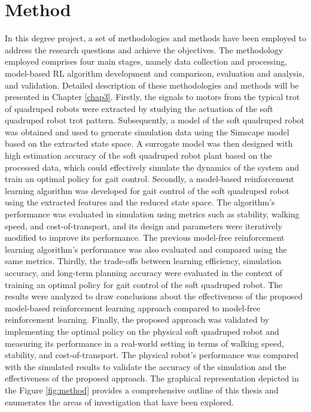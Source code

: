 \section{Method}
In this degree project, a set of methodologies and methods have been employed to address the research questions and achieve the objectives. The methodology employed comprises four main stages, namely data collection and processing, model-based \ac{RL} algorithm development and comparison, evaluation and analysis, and validation. Detailed description of these methodologies and methods will be presented in Chapter \ref{chap3}. Firstly, the signals to motors from the typical trot of quadruped robots were extracted by studying the actuation of the soft quadruped robot trot pattern. Subsequently, a model of the soft quadruped robot was obtained and used to generate simulation data using the Simscape model based on the extracted state space. A surrogate model was then designed with high estimation accuracy of the soft quadruped robot plant based on the processed data, which could effectively simulate the dynamics of the system and train an optimal policy for gait control. Secondly, a model-based reinforcement learning algorithm was developed for gait control of the soft quadruped robot using the extracted features and the reduced state space. The algorithm's performance was evaluated in simulation using metrics such as stability, walking speed, and cost-of-transport, and its design and parameters were iteratively modified to improve its performance. The previous model-free reinforcement learning algorithm's performance was also evaluated and compared using the same metrics. Thirdly, the trade-offs between learning efficiency, simulation accuracy, and long-term planning accuracy were evaluated in the context of training an optimal policy for gait control of the soft quadruped robot. The results were analyzed to draw conclusions about the effectiveness of the proposed model-based reinforcement learning approach compared to model-free reinforcement learning. Finally, the proposed approach was validated by implementing the optimal policy on the physical soft quadruped robot and measuring its performance in a real-world setting in terms of walking speed, stability, and cost-of-transport. The physical robot's performance was compared with the simulated results to validate the accuracy of the simulation and the effectiveness of the proposed approach. The graphical representation depicted in the Figure \ref{fig:method} provides a comprehensive outline of this thesis and enumerates the areas of investigation that have been explored.



